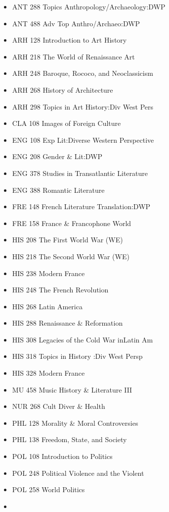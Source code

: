 \documentclass[
  letterpaper,
]{scrbook}
\providecommand{\tightlist}{%
  \setlength{\itemsep}{0pt}\setlength{\parskip}{0pt}}
\begin{document}
\begin{itemize}
\tightlist
\item
  ANT 288 Topics Anthropology/Archaeology:DWP
\item
  ANT 488 Adv Top Anthro/Archaeo:DWP
\item
  ARH 128 Introduction to Art History
\item
  ARH 218 The World of Renaissance Art
\item
  ARH 248 Baroque, Rococo, and Neoclassicism
\item
  ARH 268 History of Architecture
\item
  ARH 298 Topics in Art History:Div West Pers
\item
  CLA 108 Images of Foreign Culture
\item
  ENG 108 Exp Lit:Diverse Western Perspective
\item
  ENG 208 Gender \& Lit:DWP
\item
  ENG 378 Studies in Transatlantic Literature
\item
  ENG 388 Romantic Literature
\item
  FRE 148 French Literature Translation:DWP
\item
  FRE 158 France \& Francophone World
\item
  HIS 208 The First World War (WE)
\item
  HIS 218 The Second World War (WE)
\item
  HIS 238 Modern France
\item
  HIS 248 The French Revolution
\item
  HIS 268 Latin America
\item
  HIS 288 Renaissance \& Reformation
\item
  HIS 308 Legacies of the Cold War inLatin Am
\item
  HIS 318 Topics in History :Div West Persp
\item
  HIS 328 Modern France
\item
  MU 458 Music History \& Literature III
\item
  NUR 268 Cult Diver \& Health
\item
  PHL 128 Morality \& Moral Controversies
\item
  PHL 138 Freedom, State, and Society
\item
  POL 108 Introduction to Politics
\item
  POL 248 Political Violence and the Violent
\item
  POL 258 World Politics
\item

\end{itemize}
\end{document}
